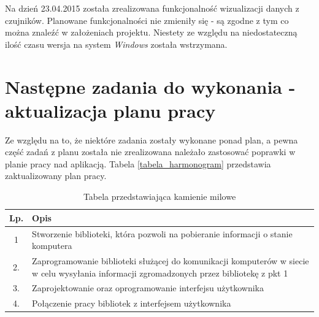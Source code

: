 \documentclass[a4paper]{article}
\begin{document}
Na dzień 23.04.2015 została zrealizowana funkcjonalność wizualizacji danych z czujników. Planowane funkcjonalności nie zmieniły się - są zgodne z tym co można znaleźć w założeniach projektu. Niestety ze względu na niedostateczną ilość czasu wersja na system \textit{Windows} została wstrzymana.

\section{Następne zadania do wykonania - aktualizacja planu pracy}
Ze względu na to, że niektóre zadania zostały wykonane ponad plan, a pewna część zadań z planu została nie zrealizowana należało zastosować poprawki w planie pracy nad aplikacją. Tabela \ref{tabela_harmonogram} przedstawia zaktualizowany plan pracy.
\begin{table}[h]
			\centering
			\begin{tabularx}{0.65\textwidth}{|c|X|}
				\hline
				Lp. & Opis \\ \hline
				1 & Stworzenie biblioteki, która pozwoli na pobieranie informacji o stanie komputera \\ \hline
				2. & Zaprogramowanie biblioteki służącej do komunikacji komputerów w siecie w celu wysyłania informacji zgromadzonych przez bibliotekę z pkt 1 \\ \hline
				3. & Zaprojektowanie oraz oprogramowanie interfejsu użytkownika \\ \hline
				4. & Połączenie pracy bibliotek z interfejsem użytkownika \\ \hline
			\end{tabularx}
			\caption{Tabela przedstawiająca kamienie milowe}
		\end{table}
\end{document}
